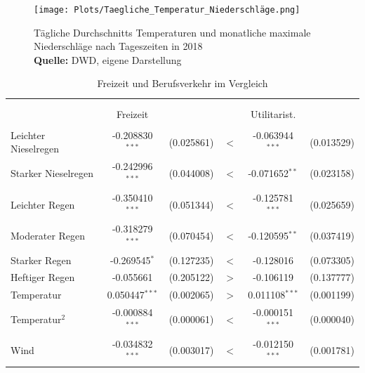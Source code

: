 \documentclass[a4paper,12pt]{thesis}
\newcommand*{\captionsource}[2]{%
	\caption[{#1}]{%
		#1%
		\\\hspace{\linewidth}%
		\textbf{Quelle:} #2%
	}%
}
\begin{document}
\begin{figure}[!ht]
	\centering
	\texttt{[image: Plots/Taegliche\_Temperatur\_Niederschläge.png]}
	\captionsource{Tägliche Durchschnitts Temperaturen und monatliche maximale Niederschläge nach Tageszeiten in 2018}{
		DWD, eigene Darstellung
	}
	\label{fig:meine-grafik5}
\end{figure}

\begin{table}[!htbp] \centering 
	\caption{Freizeit und Berufsverkehr im Vergleich} 
	\label{utilitarianvsFreizeit} 
	\begin{tabular}{@{\extracolsep{-5pt}}lccccc} 
		\\[-1.8ex]\hline 
		\hline \\[-1.8ex] 
		\\[-1.8ex] & Freizeit & & & Utilitarist. & \\ 
		\hline \\[-1.8ex] 
		
		Leichter Nieselregen & -0.208830$^{***}$ & (0.025861) & $<$ & -0.063944$^{***}$ & (0.013529)\\ 
		
		Starker Nieselregen & -0.242996$^{***}$ & (0.044008) & $<$ & -0.071652$^{**}$ & (0.023158)\\ 
		
		Leichter Regen & -0.350410$^{***}$ & (0.051344) & $<$ & -0.125781$^{***}$ & (0.025659)\\ 
		
		Moderater Regen & -0.318279$^{***}$ & (0.070454) & $<$ & -0.120595$^{**}$ & (0.037419)\\ 
		
		Starker Regen & -0.269545$^{*}$ & (0.127235) & $<$ & -0.128016 & (0.073305)\\ 
		
		Heftiger Regen & -0.055661 & (0.205122) & $>$ & -0.106119 & (0.137777)\\ 
		
		Temperatur & 0.050447$^{***}$ & (0.002065) & $>$ & 0.011108$^{***}$ & (0.001199)\\ 
		
		Temperatur$^2$ & -0.000884$^{***}$ & (0.000061) & $<$ & -0.000151$^{***}$ & (0.000040)\\ 
		
		Wind & -0.034832$^{***}$ & (0.003017) & $<$ & -0.012150$^{***}$ & (0.001781)\\ 
		

\end{tabular}
\end{table}
\end{document}
